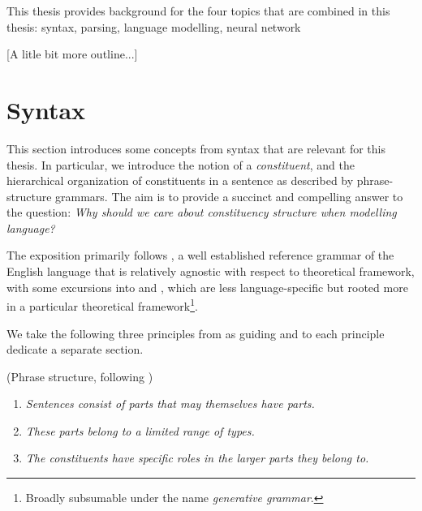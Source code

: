 % 

This thesis provides background for the four topics that are combined in this thesis: syntax, parsing, language modelling, neural network

[A litle bit more outline...]

\section{Syntax}
This section introduces some concepts from syntax that are relevant for this thesis. In particular, we introduce the notion of a \textit{constituent}, and the hierarchical organization of constituents in a sentence as described by phrase-structure grammars. The aim is to provide a succinct and compelling answer to the question: \textit{Why should we care about constituency structure when modelling language?}

The exposition primarily follows \citet{huddleston2002grammar}, a well established reference grammar of the English language that is relatively agnostic with respect to theoretical framework, with some excursions into \citet{carnie2010constituent} and \citet{everaert2015structures}, which are less language-specific but rooted more in a particular theoretical framework\footnote{Broadly subsumable under the name \textit{generative grammar}.}.

We take the following three principles from \citet{huddleston2002grammar} as guiding and to each principle dedicate a separate section.
\begin{definition}{(Phrase structure, following \citep{huddleston2002grammar})}
  \begin{enumerate}[noitemsep]
    \item \textit{Sentences consist of parts that may themselves have parts.}
    \item \textit{These parts belong to a limited range of types.}
    \item \textit{The constituents have specific roles in the larger parts they belong to.}
  \end{enumerate}
\end{definition}


